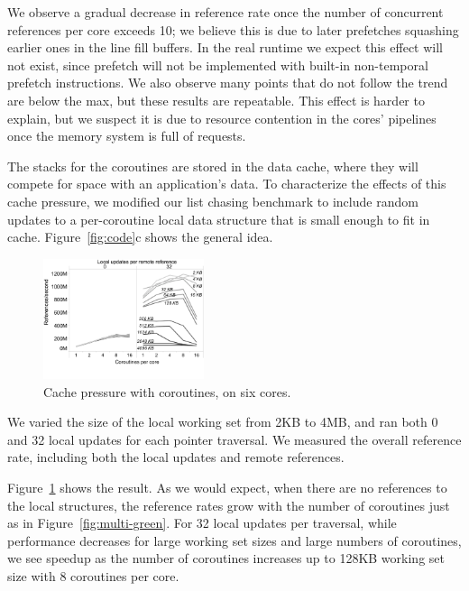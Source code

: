 \documentclass[10pt,nocopyrightspace,preprint]{sigplanconf}
\begin{document}
We observe a gradual decrease in reference rate once the number of
concurrent references per core exceeds 10; we believe this is due to
later prefetches squashing earlier ones in the line fill buffers. In the real runtime we expect this effect will not exist, since prefetch will not be implemented with built-in non-temporal prefetch instructions. We
also observe many points that do not follow the trend are below the max, but these results are repeatable. This effect is harder to explain, but we suspect it is
due to resource contention in the cores' pipelines once the memory
system is full of requests. 



The stacks for the coroutines are stored in the data cache, where they
will compete for space with an application's data. To characterize the
effects of this cache pressure, we modified our list chasing benchmark
to include random updates to a per-coroutine local data structure that
is small enough to fit in cache. Figure~\ref{fig:code}c shows the
general idea.

\begin{figure}[h]
  \begin{center}
    \includegraphics[width=0.42\textwidth]{figures/cache-pressure-edited.pdf}
  \end{center}
  \vspace{-0.3in}
  \caption{Cache pressure with coroutines, on six cores.}
  \label{fig:cache-pressure}
\end{figure}

We varied the size of the local working set from 2KB
to 4MB, and ran both 0 and 32 local updates for each pointer
traversal. We measured the overall reference rate, including both the local updates and remote references.

Figure~\ref{fig:cache-pressure} shows the result. As we would expect,
when there are no references to the local structures, the reference rates grow with the number of coroutines just as in
Figure~\ref{fig:multi-green}. For 32 local updates per traversal, while performance
decreases for large working set sizes and large numbers of coroutines,
we see speedup as the number of coroutines increases up to 128KB working set size with 8 coroutines per
core. 
\end{document}
